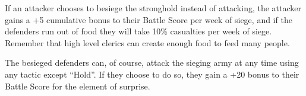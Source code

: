 \begin{multicols*}{2}
If an attacker chooses to besiege the stronghold instead of attacking, the attacker gains a +5 cumulative bonus to their Battle Score per week of siege, and if the defenders run out of food they will take 10\% casualties per week of siege. Remember that high level clerics can create enough food to feed many people.

The besieged defenders can, of course, attack the sieging army at any time using any tactic except “Hold”. If they choose to do so, they gain a +20 bonus to their Battle Score for the element of surprise.

\end{multicols*}

